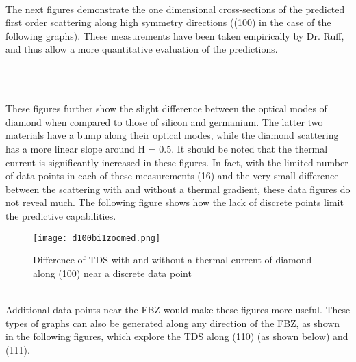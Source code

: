 \documentclass[aip,jap,12 pt,preprint]{revtex4-1}
\begin{document}
\\
The next figures demonstrate the one dimensional cross-sections of the predicted first order scattering along high symmetry directions ((100) in the case of the following graphs). These measurements have been taken empirically by Dr. Ruff, and thus allow a more quantitative evaluation of the predictions.
\begin{figure}[htb!]
\leavevmode
{}
\\
\end{figure}
\\
These figures further show the slight difference between the optical modes of diamond when compared to those of silicon and germanium. The latter two materials have a bump along their optical modes, while the diamond scattering has a more linear slope around H = 0.5. It should be noted that the thermal current is significantly increased in these figures. In fact, with the limited number of data points in each of these measurements (16) and the very small difference between the scattering with and without a thermal gradient, these data figures do not reveal much. The following figure shows how the lack of discrete points limit the predictive capabilities.
\begin{figure}
{\texttt{[image: d100bi1zoomed.png]}}
\caption{Difference of TDS with and without a thermal current of diamond along (100) near a discrete data point}
\end{figure}
\\
Additional data points near the FBZ would make these figures more useful. These types of graphs can also be generated along any direction of the FBZ, as shown in the following figures, which explore the TDS along (110) (as shown below) and (111).
\\
\begin{figure}[htb!]
\leavevmode
{}
\\
\end{figure}
\end{document}
